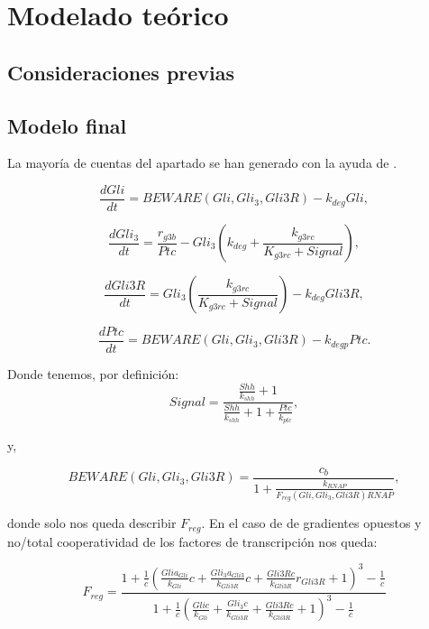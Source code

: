 \chapter{Modelado teórico}

\label{ch:model}

\section{Consideraciones previas}


\section{Modelo final}

La mayoría de cuentas del apartado se han generado con la ayuda de \cite{sympy}.

\begin{equation}
\frac{dGli}{dt} = BEWARE(Gli, Gli_3, Gli3R)-k_{deg}Gli,
\label{eq:1}
\end{equation}

\begin{equation}
\frac{dGli_3}{dt} = \frac{r_{g3b}}{Ptc}-Gli_3\left(k_{deg}+\frac{k_{g3rc}}{K_{g3rc}+Signal}\right),
\label{eq:2}
\end{equation}

\begin{equation}
\frac{dGli3R}{dt}= Gli_3\left(\frac{k_{g3rc}}{K_{g3rc}+Signal}\right)-k_{deg}Gli3R,
\label{eq:3}
\end{equation}

\begin{equation}
\frac{dPtc}{dt} = BEWARE(Gli, Gli_3, Gli3R)-k_{degp}Ptc.
\label{eq:4}
\end{equation}


Donde tenemos, por definición:
 \begin{equation}
Signal=\frac{\frac{Shh}{k_{shh}} + 1}{\frac{Shh}{k_{shh}} + 1 + \frac{Ptc}{k_{ptc}}},
\label{signal} \end{equation}

y,


\begin{equation}
BEWARE(Gli, Gli_3, Gli3R)=\frac{c_{b}}{1 + \frac{k_{RNAP}}{F_{reg}(Gli, Gli_3, Gli3R) RNAP}},
\end{equation}

donde solo nos queda describir $F_{reg}$. En el caso de de gradientes opuestos y no/total cooperatividad de los factores de transcripción nos queda:

\begin{equation}
F_{reg}=\frac{1 + \frac{1}{c} \left(\frac{Gli a_{Gli}}{k_{Gli}} c + \frac{Gli_{3} a_{Gli3}}{k_{Gli3R}} c + \frac{Gli3R c}{k_{Gli3R}} r_{Gli3R} + 1\right)^{3} - \frac{1}{c}}{1 + \frac{1}{c} \left(\frac{Gli c}{k_{Gli}} + \frac{Gli_{3} c}{k_{Gli3R}} + \frac{Gli3R c}{k_{Gli3R}} + 1\right)^{3} - \frac{1}{c}}
\end{equation}






